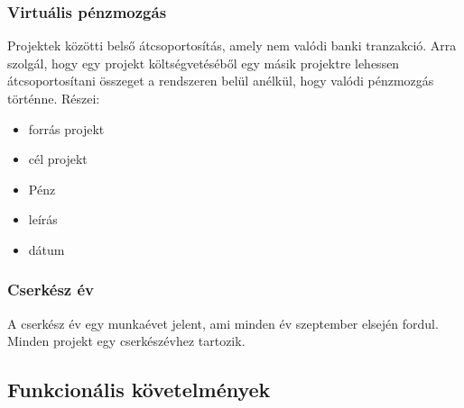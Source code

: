 \documentclass[a4paper,12pt]{article}
\begin{document}
\subsubsection{Virtuális pénzmozgás}
Projektek közötti belső átcsoportosítás, amely nem valódi banki tranzakció. Arra szolgál, hogy egy projekt költségvetéséből egy másik projektre lehessen átcsoportosítani összeget a rendszeren belül anélkül, hogy valódi pénzmozgás történne. Részei:
\begin{itemize}
  \item forrás projekt
  \item cél projekt
  \item Pénz
  \item leírás
  \item dátum
\end{itemize}
\subsubsection{Cserkész év}
A cserkész év egy munkaévet jelent, ami minden év szeptember elsején fordul. Minden projekt egy cserkészévhez tartozik.

\subsection{Funkcionális követelmények}
\end{document}
